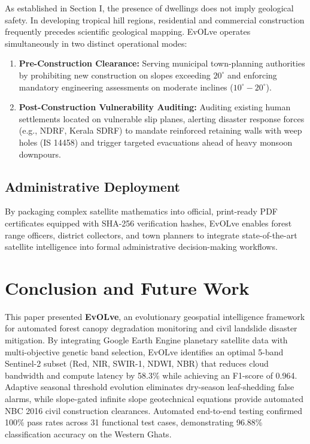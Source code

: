 \documentclass[conference]{IEEEtran}
\begin{document}
As established in Section I, the presence of dwellings does not imply geological safety. In developing tropical hill regions, residential and commercial construction frequently precedes scientific geological mapping. EvOLve operates simultaneously in two distinct operational modes:
\begin{enumerate}
    \item \textbf{Pre-Construction Clearance:} Serving municipal town-planning authorities by prohibiting new construction on slopes exceeding $20^\circ$ and enforcing mandatory engineering assessments on moderate inclines ($10^\circ - 20^\circ$).
    \item \textbf{Post-Construction Vulnerability Auditing:} Auditing existing human settlements located on vulnerable slip planes, alerting disaster response forces (e.g., NDRF, Kerala SDRF) to mandate reinforced retaining walls with weep holes (IS 14458) and trigger targeted evacuations ahead of heavy monsoon downpours.
\end{enumerate}

\subsection{Administrative Deployment}
By packaging complex satellite mathematics into official, print-ready PDF certificates equipped with SHA-256 verification hashes, EvOLve enables forest range officers, district collectors, and town planners to integrate state-of-the-art satellite intelligence into formal administrative decision-making workflows.

\section{Conclusion and Future Work}
This paper presented \textbf{EvOLve}, an evolutionary geospatial intelligence framework for automated forest canopy degradation monitoring and civil landslide disaster mitigation. By integrating Google Earth Engine planetary satellite data with multi-objective genetic band selection, EvOLve identifies an optimal 5-band Sentinel-2 subset (Red, NIR, SWIR-1, NDWI, NBR) that reduces cloud bandwidth and compute latency by 58.3\% while achieving an F1-score of 0.964. Adaptive seasonal threshold evolution eliminates dry-season leaf-shedding false alarms, while slope-gated infinite slope geotechnical equations provide automated NBC 2016 civil construction clearances. Automated end-to-end testing confirmed 100\% pass rates across 31 functional test cases, demonstrating 96.88\% classification accuracy on the Western Ghats.
\end{document}
